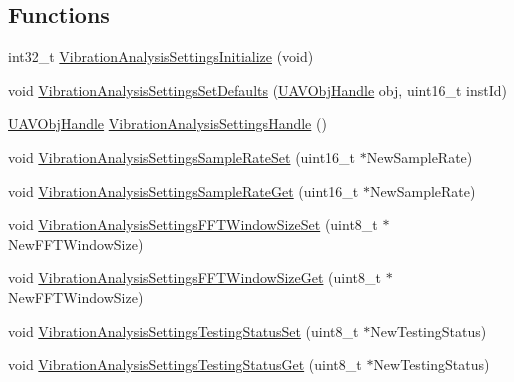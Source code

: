 \subsection*{\-Functions}
\begin{DoxyCompactItemize}
\item 
int32\-\_\-t \hyperlink{group___vibration_analysis_settings_gaed868b927bde801e367ebc64b4a2f85f}{\-Vibration\-Analysis\-Settings\-Initialize} (void)
\item 
void \hyperlink{group___vibration_analysis_settings_ga610488684849a4401cad7a0c92684414}{\-Vibration\-Analysis\-Settings\-Set\-Defaults} (\hyperlink{targets_2_u_a_v_objects_2inc_2uavobjectmanager_8h_a279053e22be53ce9f895043aaeb91e3b}{\-U\-A\-V\-Obj\-Handle} obj, uint16\-\_\-t inst\-Id)
\item 
\hyperlink{targets_2_u_a_v_objects_2inc_2uavobjectmanager_8h_a279053e22be53ce9f895043aaeb91e3b}{\-U\-A\-V\-Obj\-Handle} \hyperlink{group___vibration_analysis_settings_ga7cc3f1f77abb78ee80b470e76b649c3a}{\-Vibration\-Analysis\-Settings\-Handle} ()
\item 
void \hyperlink{group___vibration_analysis_settings_gad27ed310a79c3909a24091ca8f001962}{\-Vibration\-Analysis\-Settings\-Sample\-Rate\-Set} (uint16\-\_\-t $\ast$\-New\-Sample\-Rate)
\item 
void \hyperlink{group___vibration_analysis_settings_ga9a00d813bf930107538661a4f5a69876}{\-Vibration\-Analysis\-Settings\-Sample\-Rate\-Get} (uint16\-\_\-t $\ast$\-New\-Sample\-Rate)
\item 
void \hyperlink{group___vibration_analysis_settings_ga96de410a4447938a40334d59c253c468}{\-Vibration\-Analysis\-Settings\-F\-F\-T\-Window\-Size\-Set} (uint8\-\_\-t $\ast$\-New\-F\-F\-T\-Window\-Size)
\item 
void \hyperlink{group___vibration_analysis_settings_ga21a35dffdba8fb625eaa65ee77286350}{\-Vibration\-Analysis\-Settings\-F\-F\-T\-Window\-Size\-Get} (uint8\-\_\-t $\ast$\-New\-F\-F\-T\-Window\-Size)
\item 
void \hyperlink{group___vibration_analysis_settings_ga40ce856ccec4c70c9b5a1c8021449c7f}{\-Vibration\-Analysis\-Settings\-Testing\-Status\-Set} (uint8\-\_\-t $\ast$\-New\-Testing\-Status)
\item 
void \hyperlink{group___vibration_analysis_settings_ga5f98ad3ac8a4ebdf8506518f4ae31ce6}{\-Vibration\-Analysis\-Settings\-Testing\-Status\-Get} (uint8\-\_\-t $\ast$\-New\-Testing\-Status)
\end{DoxyCompactItemize}


